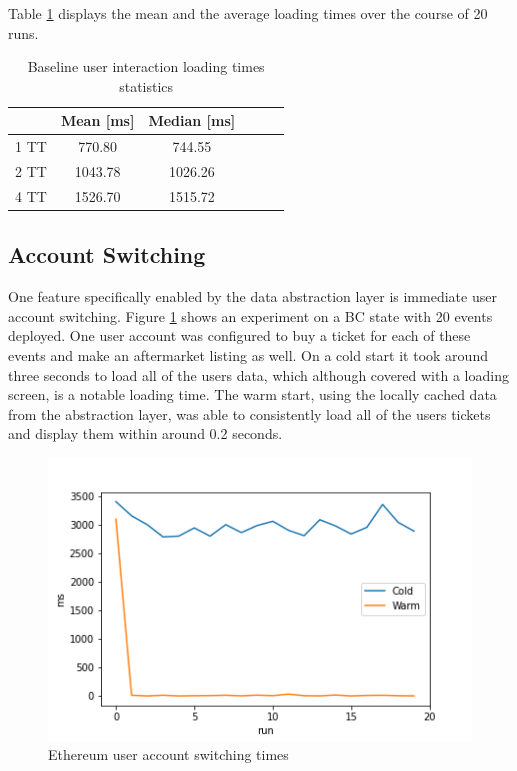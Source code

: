 Table \ref{tab:baseline1} displays the mean and the average loading times over the course of 20 runs.


\begin{table}[ht]
\centering
\begin{tabular}{|c|c|c|c|c|c|}
\hline
 & \textbf{Mean [ms]} & \textbf{Median [ms]} \\ \hline
1 TT & 770.80             & 744.55      \\ \hline
2 TT & 1043.78             & 1026.26       \\ \hline
4 TT & 1526.70               & 1515.72        \\ \hline
\end{tabular}
\caption{Baseline user interaction loading times statistics}
\label{tab:baseline1}
\end{table}


\subsection{Account Switching}\label{section:account-switching}

One feature specifically enabled by the data abstraction layer is immediate user account switching. Figure \ref{img:user_int} shows an experiment on a BC state with 20 events deployed. One user account was configured to buy a ticket for each of these events and make an aftermarket listing as well. On a cold start it took around three seconds to load all of the users data, which although covered with a loading screen, is a notable loading time. The warm start, using the locally cached data from the abstraction layer, was able to consistently load all of the users tickets and display them within around 0.2 seconds.

\begin{figure}[H]
    \centering
    \includegraphics[width=14cm]{images/plot3.png}
    \caption{Ethereum user account switching times \protect\footnotemark}
    \label{img:user_int}
\end{figure}

